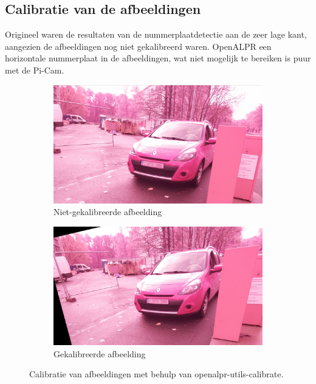 \subsection{Calibratie van de afbeeldingen}
Origineel waren de resultaten van de nummerplaatdetectie aan de zeer lage kant, aangezien de afbeeldingen nog niet gekalibreerd waren. OpenALPR een horizontale nummerplaat in de afbeeldingen, wat niet mogelijk te bereiken  is puur met de Pi-Cam.
\begin{figure}[h!]
	\centering
	\begin{subfigure}[b]{0.4\linewidth}
		\includegraphics[width=\linewidth]{img/calibration/pre-calibrate.png}
		\caption{Niet-gekalibreerde afbeelding}
	\end{subfigure}
	\begin{subfigure}[b]{0.4\linewidth}
		\includegraphics[width=\linewidth]{img/calibration/calibrate-cut.png}
		\caption{Gekalibreerde afbeelding}
	\end{subfigure}
	\label{fig:calibration}
	\caption{Calibratie van afbeeldingen met behulp van openalpr-utils-calibrate.}
\end{figure}


